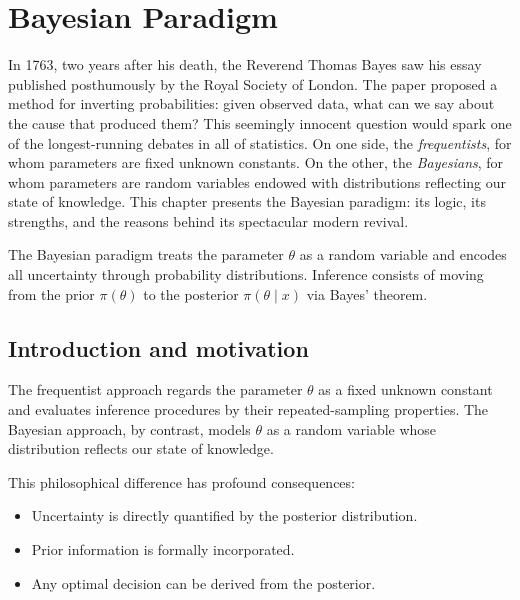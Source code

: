 \chapter{Bayesian Paradigm}
\label{ch:paradigm}

In 1763, two years after his death, the Reverend Thomas Bayes saw his essay
published posthumously by the Royal Society of London. The paper proposed a
method for inverting probabilities: given observed data, what can we say
about the cause that produced them? This seemingly innocent question would
spark one of the longest-running debates in all of statistics. On one side,
the \emph{frequentists}, for whom parameters are fixed unknown constants. On
the other, the \emph{Bayesians}, for whom parameters are random variables
endowed with distributions reflecting our state of knowledge. This chapter
presents the Bayesian paradigm: its logic, its strengths, and the reasons
behind its spectacular modern revival.

\begin{intuition}[title=\textbf{Central idea}]
The Bayesian paradigm treats the parameter $\theta$ as a random variable
and encodes all uncertainty through probability distributions. Inference
consists of moving from the prior $\pi(\theta)$ to the posterior
$\pi(\theta \mid x)$ via Bayes' theorem.
\end{intuition}

\section{Introduction and motivation}

The frequentist approach regards the parameter $\theta$ as a fixed
unknown constant and evaluates inference procedures by their repeated-sampling
properties. The Bayesian approach, by contrast, models $\theta$ as a
random variable whose distribution reflects our state of knowledge.

This philosophical difference has profound consequences:
\begin{itemize}
  \item Uncertainty is directly quantified by the posterior distribution.
  \item Prior information is formally incorporated.
  \item Any optimal decision can be derived from the posterior.
\end{itemize}

